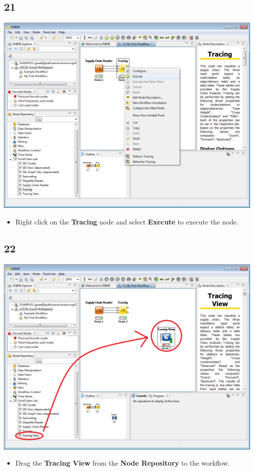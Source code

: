 \documentclass{beamer}
\begin{document}
\subsection{21}
\begin{frame}
	\begin{center}
  		\includegraphics[height=0.6\textheight]{21.png}
	\end{center}
	\begin{itemize}
		\item Right click on the \textbf{Tracing} node and select \textbf{Execute} to execute the node.
	\end{itemize}
\end{frame}

\subsection{22}
\begin{frame}
	\begin{center}
  		\includegraphics[height=0.6\textheight]{22.png}
	\end{center}
	\begin{itemize}
		\item Drag the \textbf{Tracing View} from the \textbf{Node Repository} to the workflow.
	\end{itemize}
\end{frame}
\end{document}
